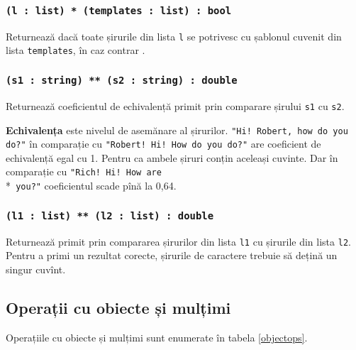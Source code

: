 \subsubsection{\texttt{(l : list) * (templates : list) : bool}}

Returnează \true{} dacă toate șirurile din lista \texttt{l} se potrivesc cu șablonul cuvenit din lista \texttt{templates}, în caz contrar \false{}.

\subsubsection{\texttt{(s1 : string) ** (s2 : string) : double}}

Returnează coeficientul de echivalență primit prin comparare șirului \texttt{s1} cu \texttt{s2}.

{\bf Echivalența} este nivelul de asemănare al șirurilor. \texttt{"Hi! Robert, how do you do?"} în comparație cu \texttt{"Robert! Hi! How do you do?"} are coeficient de echivalență egal cu 1. Pentru ca ambele șiruri conțin aceleași cuvinte. Dar în comparație cu  \texttt{"Rich! Hi! How are}\\*\texttt{ you?"} coeficientul scade pînă la 0,64.

\subsubsection{\texttt{(l1 : list) ** (l2 : list) : double}}

Returnează primit prin compararea șirurilor din lista \texttt{l1} cu șirurile din lista \texttt{l2}.
Pentru a primi un rezultat corecte, șirurile de caractere trebuie să dețină un singur cuvînt.

\subsection{Operații cu obiecte și mulțimi}

Operațiile cu obiecte și mulțimi sunt enumerate în tabela \ref{objectops}.

